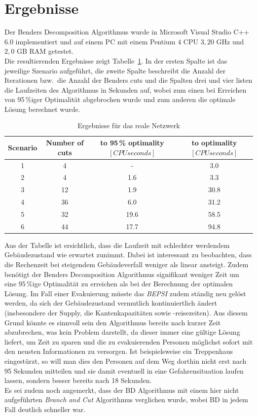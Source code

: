 \documentclass[a4paper, 11pt]{scrreprt}
\begin{document}
\section{Ergebnisse}
Der Benders Decomposition Algorithmus wurde in Microsoft Visual Studio C++ 6.0 implementiert und auf einem
PC mit einem Pentium $4$ CPU $3,20$ GHz und $2,0$ GB RAM getestet.\\
Die resultierenden Ergebnisse zeigt Tabelle~\ref{tab:ergebnisse}. In der ersten Spalte ist das jeweilige
Szenario aufgeführt, die zweite Spalte beschreibt die Anzahl der Iterationen bzw.\ die Anzahl der Benders
cuts und die Spalten drei und vier listen die Laufzeiten des Algorithmus in Sekunden auf, wobei
zum einen bei Erreichen von 95\,\%iger Optimalität abgebrochen wurde und zum anderen die optimale Lösung
berechnet wurde.
\begin{table}[htb!]
\centering
\caption{Ergebnisse für das reale Netzwerk}
\label{tab:ergebnisse}
\begin{tabular}[c]{|c|c|c|c|}\hline
  Scenario & Number of cuts & to 95\,\% optimality $[CPU seconds]$ & to optimality $[CPU seconds]$  \\\hline\hline
  1 &  4 & -    &  3.0 \\\hline
  2 &  4 & 1.6  &  3.3 \\\hline
  3 & 12 & 1.9  & 30.8 \\\hline
  4 & 36 & 6.0  & 31.2 \\\hline
  5 & 32 & 19.6 & 58.5 \\\hline
  6 & 44 & 17.7 & 94.8 \\\hline
\end{tabular}
\end{table}
Aus der Tabelle ist ersichtlich, dass die Laufzeit mit schlechter werdendem Gebäudezustand
wie erwartet zunimmt.
Dabei ist interessant zu beobachten, dass die Rechenzeit bei steigendem Gebäudeverfall
weniger als linear ansteigt. Zudem benötigt der Benders Decomposition Algorithmus signifikant
weniger Zeit um eine 95\,\%ige Optimalität zu erreichen als bei der Berechnung der optimalen
Lösung. Im Fall einer Evakuierung müsste das \textit{BEPSI} zudem ständig neu gelöst werden,
da sich der Gebäudezustand vermutlich kontinuiertlich ändert (insbesondere der Supply, die
Kantenkapazitäten sowie -reisezeiten).
Aus diesem Grund könnte es sinnvoll sein den Algorithmus bereits nach kurzer Zeit
abzubrechen, was kein Problem darstellt, da dieser immer eine gültige Lösung liefert,
um Zeit zu sparen und die zu evakuierenden Personen möglichst sofort mit den neusten Informationen zu versorgen.
Ist beispielsweise ein Treppenhaus eingestürzt, so will man dies den Personen auf dem Weg
dorthin nicht erst nach 95 Sekunden mitteilen und sie damit eventuell in eine Gefahrensituation
laufen lassen, sondern besser bereits nach 18 Sekunden.\\
Es sei zudem noch angemerkt, dass der BD Algorithmus mit einem hier nicht aufgeführten
\textit{Branch and Cut} Algorithmus verglichen wurde, wobei BD in jedem Fall deutlich
schneller war.
\end{document}
